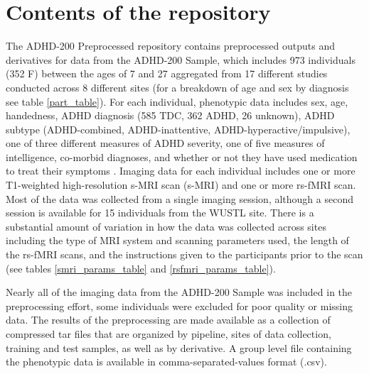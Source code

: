 \documentclass[preprint,12pt,5p]{elsarticle}
\begin{document}
\section{Contents of the repository}

The ADHD-200 Preprocessed repository contains preprocessed outputs and derivatives for data from the ADHD-200 Sample, which includes 973 individuals (352 F) between the ages of 7 and 27 aggregated from 17 different studies conducted across 8 different sites (for a breakdown of age and sex by diagnosis see table \ref{part_table}). For each individual, phenotypic data includes sex, age, handedness, ADHD diagnosis (585 TDC, 362 ADHD, 26 unknown), ADHD subtype (ADHD-combined, ADHD-inattentive, ADHD-hyperactive/impulsive), one of three different measures of ADHD severity, one of five measures of intelligence, co-morbid diagnoses, and whether or not they have used medication to treat their symptoms \cite{Milham2012}. Imaging data for each individual includes one or more T1-weighted high-resolution s-MRI scan (s-MRI) and one or more rs-fMRI scan. Most of the data was collected from a single imaging session, although a second session is available for 15 individuals from the WUSTL site. There is a substantial amount of variation in how the data was collected across sites including the type of MRI system and scanning parameters used, the length of the rs-fMRI scans, and the instructions given to the participants prior to the scan (see tables \ref{smri_params_table} and \ref{rsfmri_params_table}). 

Nearly all of the imaging data from the ADHD-200 Sample was included in the preprocessing effort, some individuals were excluded for poor quality or missing data. The results of the preprocessing are made available as a collection of compressed tar files that are organized by pipeline, sites of data collection, training and test samples, as well as by derivative. A group level file containing the phenotypic data is available in comma-separated-values format (.csv). 
\end{document}
